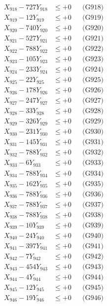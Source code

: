 \documentclass[a4paper,10pt]{article}
\begin{document}
{\begin{align}
X_{918} - 727Y_{918} &\leq +0 && \text{(G918)} \\
X_{919} - 12Y_{919} &\leq +0 && \text{(G919)} \\
X_{920} - 740Y_{920} &\leq +0 && \text{(G920)} \\
\allowbreak
X_{921} - 527Y_{921} &\leq +0 && \text{(G921)} \\
X_{922} - 788Y_{922} &\leq +0 && \text{(G922)} \\
X_{923} - 105Y_{923} &\leq +0 && \text{(G923)} \\
X_{924} - 233Y_{924} &\leq +0 && \text{(G924)} \\
X_{925} - 22Y_{925} &\leq +0 && \text{(G925)} \\
X_{926} - 178Y_{926} &\leq +0 && \text{(G926)} \\
X_{927} - 247Y_{927} &\leq +0 && \text{(G927)} \\
X_{928} - 33Y_{928} &\leq +0 && \text{(G928)} \\
X_{929} - 326Y_{929} &\leq +0 && \text{(G929)} \\
X_{930} - 231Y_{930} &\leq +0 && \text{(G930)} \\
\allowbreak
X_{931} - 145Y_{931} &\leq +0 && \text{(G931)} \\
X_{932} - 788Y_{932} &\leq +0 && \text{(G932)} \\
X_{933} - 6Y_{933} &\leq +0 && \text{(G933)} \\
X_{934} - 788Y_{934} &\leq +0 && \text{(G934)} \\
X_{935} - 162Y_{935} &\leq +0 && \text{(G935)} \\
X_{936} - 788Y_{936} &\leq +0 && \text{(G936)} \\
X_{937} - 788Y_{937} &\leq +0 && \text{(G937)} \\
X_{938} - 788Y_{938} &\leq +0 && \text{(G938)} \\
X_{939} - 10Y_{939} &\leq +0 && \text{(G939)} \\
X_{940} - 24Y_{940} &\leq +0 && \text{(G940)} \\
\allowbreak
X_{941} - 397Y_{941} &\leq +0 && \text{(G941)} \\
X_{942} - 7Y_{942} &\leq +0 && \text{(G942)} \\
X_{943} - 454Y_{943} &\leq +0 && \text{(G943)} \\
X_{944} - 4Y_{944} &\leq +0 && \text{(G944)} \\
X_{945} - 12Y_{945} &\leq +0 && \text{(G945)} \\
X_{946} - 19Y_{946} &\leq +0 && \text{(G946)} \\

\end{align}}
\end{document}
